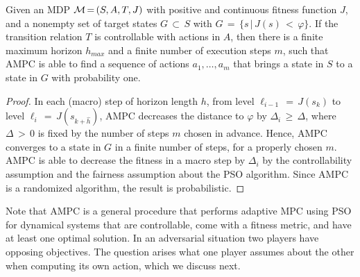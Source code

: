%


\begin{theorem}
\label{thm:ampc}
Given an MDP ${\mathcal{M}}\,{=}\,(S,A,T,J)$ with positive and continuous fitness function $J$, and a nonempty set of target states $G\,{\subset}\,S$ with $G\,{=}\,\{s\,|\,J(s)\,{<}\,\varphi\}$. If the transition relation $T$ is controllable with actions in $A$, then there is a finite maximum horizon $h_{\mathit{max}}$ and a finite number of execution steps $m$, such that AMPC is able to find a sequence of actions $a_1,\ldots,a_m$ that brings a state in $S$ to a state in $G$ with probability one.
\end{theorem}

\begin{proof}
In each (macro) step of horizon length $h$, from level $\ell_{i-1}\,{=}\,J(s_k)$ to level $\ell_i\,{=}\,J(s_{k+\widehat{h}})$, AMPC decreases the distance to $\varphi$ by $\Delta_i\,{\geqslant}\,\Delta$, where $\Delta\,{>}\,0$ is fixed by the number of steps $m$ chosen in advance. Hence, AMPC converges to a state in $G$ in a finite number of steps, for a properly chosen $m$. AMPC is able to decrease the fitness in a macro step by $\Delta_i$ by the controllability assumption and the fairness assumption about the PSO algorithm. Since AMPC is a randomized algorithm, the result is probabilistic.
\end{proof}

Note that AMPC is a general procedure that performs adaptive MPC using PSO for dynamical systems that are controllable, come with a fitness metric, and have at least one optimal solution. In an adversarial situation two players have opposing objectives. The question arises what one player assumes about the other when computing its own action, which we discuss next.
